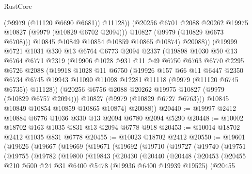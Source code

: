 \begin{lexlean}{RustCore}
\begin{coremodule}
                  (@9979 (@11120 @6690 @6681))
                  @11128))
              (@20256 @6701 @2088 @20262 @19975 @10827 (@9979 (@10829 @6702 @2094)))
              @10827
              (@9979 (@10829 @6673 @6708)))
            @10845
            @10849
            @10854
            @10859
            @10865
            @10874)
          @20088))
      (@19999
        @6721
        @1031
        @330
        @13
        @6764
        @6773
        @2094
        @2337
        (@19898
          @1030
          @50
          @13
          @6764
          @6771
          @2319
          (@19906
            @1028
            @931
            @11
            @49
            @6750
            @6763
            @6770
            @2295
            @6726
            @2088
            (@19918
              @1028
              @11
              @6750
              (@19926
                @157
                @66
                @11
                @6447
                @2350
                @6734
                @6745
                @19943
                @11090
                @11098
                @12281
                @11118
                (@9979 (@11120 @6745 @6735))
                @11128))
            (@20256 @6756 @2088 @20262 @19975 @10827 (@9979 (@10829 @6757 @2094)))
            @10827
            (@9979 (@10829 @6727 @6763)))
          @10845
          @10849
          @10854
          @10859
          @10865
          @10874)
        @20088))
@20440 := @19997 @2412 @10884 @6776 @1036 @330 @13 @2094 @6780 @2094 @5290
@20448 := @10002 @18702 @163 @1035 @831 @13 @2094 @6778 @918
@20453 := @10014 @18702 @2412 @1035 @831 @6778
@20455 := @10023 @18702 @2412
@20550 := @19601
    (@19626
      (@19667
        (@19669
          (@19671
            (@19692
              (@19710
                (@19727
                  (@19740
                    (@19751
                      (@19755
                        (@19782
                          (@19800
                            (@19843
                              (@20430
                                (@20440
                                  (@20448
                                    (@20453
                                      (@20455
                                        @210
                                        @500
                                        @24
                                        @31
                                        @6400
                                        @5478
                                        (@19936 @6400 @19939 @19525)
                                        (@20455

\end{coremodule}
\end{lexlean}
